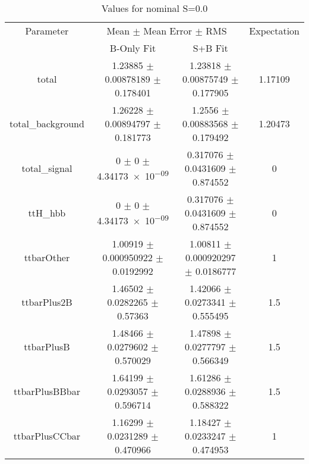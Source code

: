 \begin{table}
\centering
\caption{Values for nominal S=0.0}
\begin{tabular}{cccc}
\toprule
Parameter & \multicolumn{2}{c}{Mean $\pm$ Mean Error $\pm$ RMS} & Expectation\\
 & B-Only Fit & S+B Fit & \\
\midrule
total & \num{1.23885} $\pm$ \num{0.00878189} $\pm$ \num{0.178401} & \num{1.23818} $\pm$ \num{0.00875749} $\pm$ \num{0.177905} & \num{1.17109}\\
total\_background & \num{1.26228} $\pm$ \num{0.00894797} $\pm$ \num{0.181773} & \num{1.2556} $\pm$ \num{0.00883568} $\pm$ \num{0.179492} & \num{1.20473}\\
total\_signal & \num{0} $\pm$ \num{0} $\pm$ \num{4.34173e-09} & \num{0.317076} $\pm$ \num{0.0431609} $\pm$ \num{0.874552} & \num{0}\\
ttH\_hbb & \num{0} $\pm$ \num{0} $\pm$ \num{4.34173e-09} & \num{0.317076} $\pm$ \num{0.0431609} $\pm$ \num{0.874552} & \num{0}\\
ttbarOther & \num{1.00919} $\pm$ \num{0.000950922} $\pm$ \num{0.0192992} & \num{1.00811} $\pm$ \num{0.000920297} $\pm$ \num{0.0186777} & \num{1}\\
ttbarPlus2B & \num{1.46502} $\pm$ \num{0.0282265} $\pm$ \num{0.57363} & \num{1.42066} $\pm$ \num{0.0273341} $\pm$ \num{0.555495} & \num{1.5}\\
ttbarPlusB & \num{1.48466} $\pm$ \num{0.0279602} $\pm$ \num{0.570029} & \num{1.47898} $\pm$ \num{0.0277797} $\pm$ \num{0.566349} & \num{1.5}\\
ttbarPlusBBbar & \num{1.64199} $\pm$ \num{0.0293057} $\pm$ \num{0.596714} & \num{1.61286} $\pm$ \num{0.0288936} $\pm$ \num{0.588322} & \num{1.5}\\
ttbarPlusCCbar & \num{1.16299} $\pm$ \num{0.0231289} $\pm$ \num{0.470966} & \num{1.18427} $\pm$ \num{0.0233247} $\pm$ \num{0.474953} & \num{1}\\
\bottomrule
\end{tabular}
\end{table}